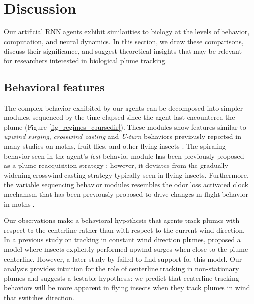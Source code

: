 \documentclass[5p,twocolumn,authoryear]{elsarticle}
\begin{document}
\section*{Discussion}
Our artificial RNN agents exhibit similarities to biology at the levels of behavior, computation, and neural dynamics. 
In this section, we draw these comparisons, discuss their significance, and suggest theoretical insights that may be relevant for researchers interested in biological plume tracking.

\subsection*{Behavioral features}
The complex behavior exhibited by our agents can be decomposed into simpler modules, 
sequenced by the time elapsed since the agent last encountered the plume (Figure \ref{fig_regimes_coursedir}).
These modules show features similar to \textit{upwind surging}, \textit{crosswind casting} and \textit{U-turn} behaviors previously reported in many studies on moths, fruit flies, and other flying insects \citep{baker2018algorithms,van2014plume,carde2008navigational, budick2006free}.
The spiraling behavior seen in the agent's \textit{lost} behavior module has been previously proposed as a plume reacquisition strategy \citep{lochmatter2009theoretical}; however, it deviates from the gradually widening crosswind casting strategy typically seen in flying insects.
Furthermore, the variable sequencing behavior modules resembles the odor loss activated clock mechanism that has been previously proposed to drive changes in flight behavior in moths \citep{kennedy1974pheromone,kennedy1983zigzagging,baker1990upwind}.

Our observations make a behavioral hypothesis that agents track plumes with respect to the centerline rather than with respect to the current wind direction.
In a previous study on tracking in constant wind direction plumes, \cite{grunbaum2015spatial} proposed a model where insects explicitly performed upwind surges when close to the plume centerline.
However, a later study by \cite{pang2018history} failed to find support for this model.
Our analysis provides intuition for the role of centerline tracking in non-stationary plumes and suggests a testable hypothesis: we predict that centerline tracking behaviors will be more apparent in flying insects when they track plumes in wind that switches direction.
\end{document}
